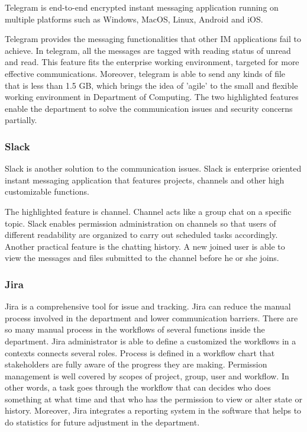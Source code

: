Telegram is end-to-end encrypted instant messaging application running on multiple platforms such as Windows, MacOS, Linux, Android and iOS.

Telegram provides the messaging functionalities that other IM applications fail to achieve. In telegram, all the messages are tagged with reading status of unread and read. This feature fits the enterprise working environment, targeted for more effective communications. Moreover, telegram is able to send any kinds of file that is less than 1.5 GB, which brings the idea of 'agile' to the small and flexible working environment in Department of Computing. The two highlighted features enable the department to solve the communication issues and security concerns partially.

\subsubsection{Slack}
Slack is another solution to the communication issues. Slack is enterprise oriented instant messaging application that features projects, channels and other high customizable functions.

The highlighted feature is channel. Channel acts like a group chat on a specific topic. Slack enables permission administration on channels so that users of different readability are organized to carry out scheduled tasks accordingly. Another practical feature is the chatting history. A new joined user is able to view the messages and files submitted to the channel before he or she joins.

\subsubsection{Jira}

Jira is a comprehensive tool for issue and tracking. Jira can reduce the manual process involved in the department and lower communication barriers. There are so many manual process in the workflows of several functions inside the department. Jira administrator is able to define a customized the workflows in a contexts connects several roles. Process is defined in a workflow chart that stakeholders are fully aware of the progress they are making. Permission management is well covered by scopes of project, group, user and workflow. In other words, a task goes through the workflow that can decides who does something at what time and that who has the permission to view or alter state or history. Moreover, Jira integrates a reporting system in the software that helps to do statistics for future adjustment in the department.

